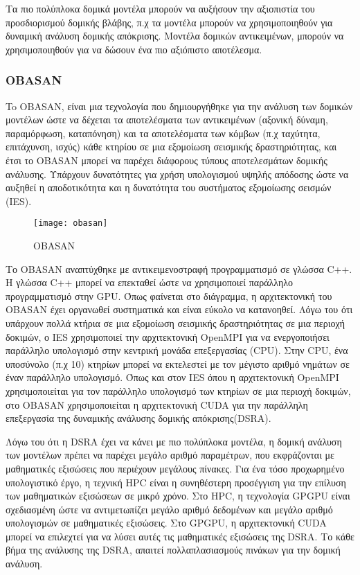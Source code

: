 Τα πιο πολύπλοκα δομικά μοντέλα μπορούν να αυξήσουν την αξιοπιστία του προσδιορισμού δομικής βλάβης, π.χ τα μοντέλα μπορούν να χρησιμοποιηθούν για δυναμική ανάλυση δομικής απόκρισης. Μοντέλα δομικών αντικειμένων, μπορούν να χρησιμοποιηθούν για να δώσουν ένα πιο αξιόπιστο αποτέλεσμα. 

\subsubsection{OBASAN}
To OBASAN, είναι μια τεχνολογία που δημιουργήθηκε για την ανάλυση των δομικών μοντέλων ώστε να δέχεται τα αποτελέσματα των αντικειμένων (αξονική δύναμη, παραμόρφωση, καταπόνηση) και τα αποτελέσματα των κόμβων (π.χ ταχύτητα, επιτάχυνση, ισχύς) κάθε κτηρίου σε μια εξομοίωση σεισμικής δραστηριότητας, και έτσι το OBASAN μπορεί να παρέχει διάφορους τύπους αποτελεσμάτων δομικής ανάλυσης. Υπάρχουν δυνατότητες για χρήση υπολογισμού υψηλής απόδοσης ώστε να αυξηθεί η αποδοτικότητα και η δυνατότητα του συστήματος εξομοίωσης σεισμών (IES). 

\begin{figure}[h]
\centering
\hspace*{-1.0in}
\texttt{[image: obasan]}
\caption{OBASAN}
\end{figure}

Το OBASAN αναπτύχθηκε με αντικειμενοστραφή προγραμματισμό σε γλώσσα C++. Η γλώσσα C++ μπορεί να επεκταθεί ώστε να χρησιμοποιεί παράλληλο προγραμματισμό στην GPU. Όπως φαίνεται στο διάγραμμα, η αρχιτεκτονική του OBASAN έχει οργανωθεί συστηματικά και είναι εύκολο να κατανοηθεί. Λόγω του ότι υπάρχουν πολλά κτήρια σε μια εξομοίωση σεισμικής δραστηριότητας σε μια περιοχή δοκιμών, ο IES χρησιμοποιεί την αρχιτεκτονική OpenMPI για να ενεργοποιήσει παράλληλο υπολογισμό στην κεντρική μονάδα επεξεργασίας (CPU). Στην CPU, ένα υποσύνολο (π.χ 10) κτηρίων μπορεί να εκτελεστεί με τον μέγιστο αριθμό νημάτων σε έναν παράλληλο υπολογισμό. Όπως και στον IES όπου η αρχιτεκτονική OpenMPI χρησιμοποιείται για τον παράλληλο υπολογισμό των κτηρίων σε μια περιοχή δοκιμών, στο OBASAN χρησιμοποιείται η αρχιτεκτονική CUDA για την παράλληλη επεξεργασία της δυναμικής ανάλυσης δομικής απόκρισης(DSRA).

Λόγω του ότι η DSRA έχει να κάνει με πιο πολύπλοκα μοντέλα, η δομική ανάλυση των μοντέλων πρέπει να παρέχει μεγάλο αριθμό παραμέτρων, που εκφράζονται με μαθηματικές εξισώσεις που περιέχουν μεγάλους πίνακες. Για ένα τόσο προχωρημένο υπολογιστικό έργο, η τεχνική HPC είναι η συνηθέστερη προσέγγιση για την επίλυση των μαθηματικών εξισώσεων σε μικρό χρόνο. Στο HPC, η τεχνολογία GPGPU είναι σχεδιασμένη ώστε να αντιμετωπίζει μεγάλο αριθμό δεδομένων και μεγάλο αριθμό υπολογισμών σε μαθηματικές εξισώσεις. Στο GPGPU, η αρχιτεκτονική CUDA μπορεί να επιλεχτεί για να λύσει αυτές τις μαθηματικές εξισώσεις της DSRA. Το κάθε βήμα της ανάλυσης της DSRA, απαιτεί πολλαπλασιασμούς πινάκων για την δομική ανάλυση.

